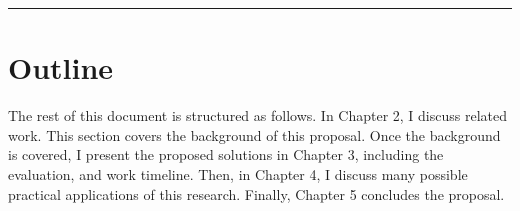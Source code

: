 \fancybreak{\pfbreakdisplay}

\section{Outline}
\label{sec:outline}

The rest of this document is structured as follows. In Chapter 2, I discuss related work.
This section covers the background of this proposal. Once the background is covered, I
present the proposed solutions in Chapter 3, including the evaluation, and work timeline. Then, in Chapter 4, I discuss many possible practical applications of this research. Finally, Chapter 5 concludes the proposal.